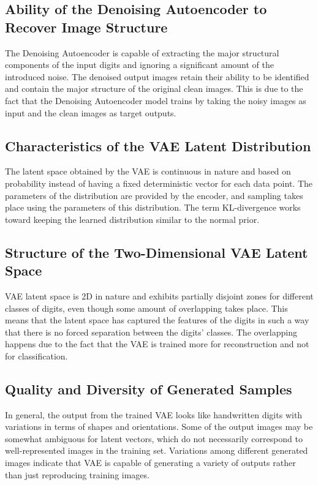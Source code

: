 \documentclass[10pt]{article}
\begin{document}
\subsection*{Ability of the Denoising Autoencoder to Recover Image Structure}
The Denoising Autoencoder is capable of extracting the major structural components of the input digits and ignoring a significant amount of the introduced noise. The denoised output images retain their ability to be identified and contain the major structure of the original clean images. This is due to the fact that the Denoising Autoencoder model trains by taking the noisy images as input and the clean images as target outputs.

\subsection*{Characteristics of the VAE Latent Distribution}
The latent space obtained by the VAE is continuous in nature and based on probability instead of having a fixed deterministic vector for each data point. The parameters of the distribution are provided by the encoder, and sampling takes place using the parameters of this distribution. The term KL-divergence works toward keeping the learned distribution similar to the normal prior.

\subsection*{Structure of the Two-Dimensional VAE Latent Space}
VAE latent space is 2D in nature and exhibits partially disjoint zones for different classes of digits, even though some amount of overlapping takes place. This means that the latent space has captured the features of the digits in such a way that there is no forced separation between the digits’ classes. The overlapping happens due to the fact that the VAE is trained more for reconstruction and not for classification.

\subsection*{Quality and Diversity of Generated Samples}
In general, the output from the trained VAE looks like handwritten digits with variations in terms of shapes and orientations. Some of the output images may be somewhat ambiguous for latent vectors, which do not necessarily correspond to well-represented images in the training set. Variations among different generated images indicate that VAE is capable of generating a variety of outputs rather than just reproducing training images.
\end{document}
